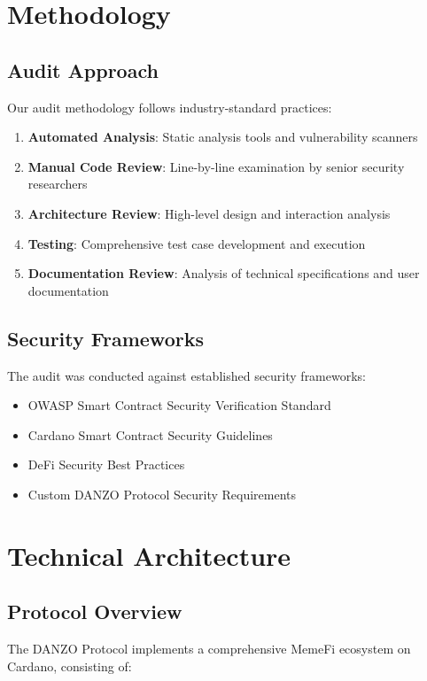 \documentclass[11pt,a4paper]{article}
\begin{document}
\section{Methodology}

\subsection{Audit Approach}
Our audit methodology follows industry-standard practices:

\begin{enumerate}
    \item \textbf{Automated Analysis}: Static analysis tools and vulnerability scanners
    \item \textbf{Manual Code Review}: Line-by-line examination by senior security researchers
    \item \textbf{Architecture Review}: High-level design and interaction analysis
    \item \textbf{Testing}: Comprehensive test case development and execution
    \item \textbf{Documentation Review}: Analysis of technical specifications and user documentation
\end{enumerate}

\subsection{Security Frameworks}
The audit was conducted against established security frameworks:
\begin{itemize}
    \item OWASP Smart Contract Security Verification Standard
    \item Cardano Smart Contract Security Guidelines
    \item DeFi Security Best Practices
    \item Custom DANZO Protocol Security Requirements
\end{itemize}

\section{Technical Architecture}

\subsection{Protocol Overview}
The DANZO Protocol implements a comprehensive MemeFi ecosystem on Cardano, consisting of:
\end{document}
